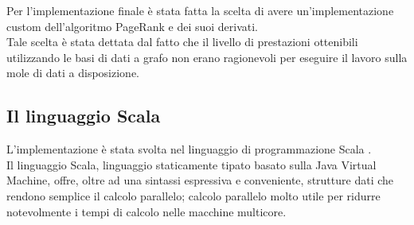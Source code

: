 \documentclass[a4paper, 12pt]{article}
\begin{document}
Per l'implementazione finale è stata fatta la scelta di avere un'implementazione custom dell'algoritmo PageRank e dei suoi derivati. \\
Tale scelta è stata dettata dal fatto che il livello di prestazioni ottenibili utilizzando le basi di dati a grafo non erano ragionevoli per eseguire il lavoro sulla mole di dati a disposizione.
\subsection{Il linguaggio Scala}
L'implementazione è stata svolta nel linguaggio di programmazione Scala \cite{scalalang}. \\
Il linguaggio Scala, linguaggio staticamente tipato basato sulla Java Virtual Machine, offre, oltre ad una sintassi espressiva e conveniente, strutture dati che rendono semplice il calcolo parallelo; calcolo parallelo molto utile per ridurre notevolmente i tempi di calcolo nelle macchine multicore.
\end{document}

